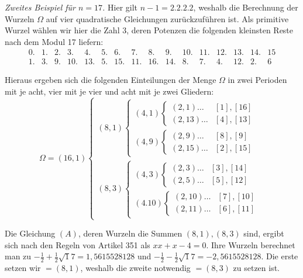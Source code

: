 
\textit{Zweites Beispiel für \(n=17\).} Hier gilt \(n-1=2.2.2.2\), weshalb die Berechnung der Wurzeln \(\Omega\) auf vier quadratische Gleichungen zurückzuführen ist. Als primitive Wurzel wählen wir hier die Zahl 3, deren Potenzen die folgenden kleinsten Reste nach dem Modul 17 liefern: {\small\setlength{\arraycolsep}{2pt}\[\begin{array}{rrrrrrrrrrrrrrrr}0.&1.&2.&3.&4.&5.&6.&7.&8.&9.&10.&11.&12.&13.&14.&15\\1.&3.&9.&10.&13.&5.&15.&11.&16.&14.&8.&7.&4.&12.&2.&6\end{array}\]}

Hieraus ergeben sich die folgenden Einteilungen der Menge \(\Omega\) in zwei Perioden mit je acht, vier mit je vier und acht mit je zwei Gliedern: {\small\setlength{\arraycolsep}{2pt}\[\Omega=(16,1)\left\{\begin{array}{l}(8,1)\left\{\begin{array}{l}(4,1)\left\{\begin{array}{ll}(2,1)\ldots&[1],[16]\\(2,13)\ldots&[4],[13]\end{array}\right.\\[4pt](4,9)\left\{\begin{array}{ll}(2,9)\ldots&[8],[9]\\(2,15)\ldots&[2],[15]\end{array}\right.\end{array}\right.\\[8pt](8,3)\left\{\begin{array}{l}(4,3)\left\{\begin{array}{ll}(2,3)\ldots&[3],[14]\\(2,5)\ldots&[5],[12]\end{array}\right.\\[4pt](4.10)\left\{\begin{array}{ll}(2,10)\ldots&[7],[10]\\(2,11)\ldots&[6],[11]\end{array}\right.\end{array}\right.\end{array}\right.\]}

Die Gleichung \((A)\), deren Wurzeln die Summen \((8,1),\allowbreak (8,3)\) sind, ergibt sich nach den Regeln von Artikel 351 als \(xx+x-4=0\). Ihre Wurzeln berechnet man zu \(-\frac12+\frac12\surd 17=1{,}5615528128\) und \(-\frac12-\frac12\surd 17=-2{,}5615528128\). Die erste setzen wir \(=(8,1)\), weshalb die zweite notwendig \(=(8,3)\) zu setzen ist.

